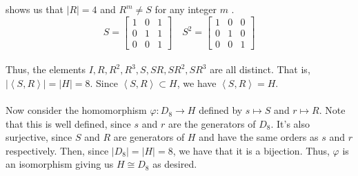 \documentclass[12 pt, letterpaper]{hmcpset}
\begin{document}
\begin{solution}
\[	\]
	shows us that $\lvert R \rvert = 4$  and $R^{m} \neq S$  for any integer $m$ .
	\[
		S = 
		\begin{bmatrix}
			1 & 0 & 1 \\
			0 & 1 & 1 \\
			0 & 0 & 1 
		\end{bmatrix} \quad
		S^{2} = 
		\begin{bmatrix}
			1 & 0 & 0 \\
			0 & 1 & 0 \\
			0 & 0 & 1
		\end{bmatrix}
	\] \\
	Thus, the elements $I, R, R^{2}, R^{3}, S, SR, SR^{2}, SR^{3}$ are all distinct. That is, $\lvert \left < S, R \right > \rvert = \lvert H \rvert = 8$. Since $\left < S, R \right > \subset H$, we have $\left < S, R \right > = H$. \\\\
	Now consider the homomorphism $\varphi : D_{8} \to H$ defined by $s \mapsto S$ and $r \mapsto R$. Note that this is well defined, since $s$ and $r$ are the generators of $D_{8}$. It's also surjective, since $S$ and $R$ are generators of $H$ and have the same orders as $s$ and $r$ respectively. Then, since $\lvert D_{8} \rvert = \lvert H \rvert = 8$, we have that it is a bijection. Thus, $\varphi$ is an isomorphism giving us $H \cong D_{8}$ as desired.
\end{solution}
\end{document}
